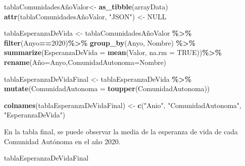\documentclass[
]{article}
\newenvironment{Shaded}{\begin{snugshade}}{\end{snugshade}}
\newcommand{\AttributeTok}[1]{\textcolor[rgb]{0.13,0.29,0.53}{#1}}
\newcommand{\ConstantTok}[1]{\textcolor[rgb]{0.56,0.35,0.01}{#1}}
\newcommand{\DecValTok}[1]{\textcolor[rgb]{0.00,0.00,0.81}{#1}}
\newcommand{\FunctionTok}[1]{\textcolor[rgb]{0.13,0.29,0.53}{\textbf{#1}}}
\newcommand{\NormalTok}[1]{#1}
\newcommand{\OtherTok}[1]{\textcolor[rgb]{0.56,0.35,0.01}{#1}}
\newcommand{\SpecialCharTok}[1]{\textcolor[rgb]{0.81,0.36,0.00}{\textbf{#1}}}
\newcommand{\StringTok}[1]{\textcolor[rgb]{0.31,0.60,0.02}{#1}}
\begin{document}
\begin{Shaded}
\begin{Highlighting}[]
\NormalTok{tablaComunidadesAñoValor}\OtherTok{\textless{}{-}} \FunctionTok{as\_tibble}\NormalTok{(arrayData)}
\FunctionTok{attr}\NormalTok{(tablaComunidadesAñoValor, }\StringTok{"JSON"}\NormalTok{) }\OtherTok{\textless{}{-}} \ConstantTok{NULL}

\NormalTok{tablaEsperanzaDeVida }\OtherTok{\textless{}{-}}\NormalTok{ tablaComunidadesAñoValor }\SpecialCharTok{\%\textgreater{}\%}
  \FunctionTok{filter}\NormalTok{(Anyo}\SpecialCharTok{==}\DecValTok{2020}\NormalTok{)}\SpecialCharTok{\%\textgreater{}\%}
  \FunctionTok{group\_by}\NormalTok{(Anyo, Nombre) }\SpecialCharTok{\%\textgreater{}\%}
  \FunctionTok{summarize}\NormalTok{(}\AttributeTok{EsperanzaDeVida =} \FunctionTok{mean}\NormalTok{(Valor, }\AttributeTok{na.rm =} \ConstantTok{TRUE}\NormalTok{))}\SpecialCharTok{\%\textgreater{}\%}
  \FunctionTok{rename}\NormalTok{(Año}\OtherTok{=}\NormalTok{Anyo,}\AttributeTok{ComunidadAutonoma=}\NormalTok{Nombre)}

\NormalTok{tablaEsperanzaDeVidaFinal }\OtherTok{\textless{}{-}}\NormalTok{ tablaEsperanzaDeVida }\SpecialCharTok{\%\textgreater{}\%}
  \FunctionTok{mutate}\NormalTok{(}\AttributeTok{ComunidadAutonoma =} \FunctionTok{toupper}\NormalTok{(ComunidadAutonoma))}

\FunctionTok{colnames}\NormalTok{(tablaEsperanzaDeVidaFinal) }\OtherTok{\textless{}{-}} \FunctionTok{c}\NormalTok{(}\StringTok{"Anio"}\NormalTok{, }\StringTok{"ComunidadAutonoma"}\NormalTok{, }\StringTok{"EsperanzaDeVida"}\NormalTok{)}
\end{Highlighting}
\end{Shaded}

En la tabla final, se puede observar la media de la esperanza de vida de
cada Comunidad Autónoma en el año 2020.

\begin{Shaded}
\begin{Highlighting}[]
\NormalTok{tablaEsperanzaDeVidaFinal}
\end{Highlighting}
\end{Shaded}
\end{document}
